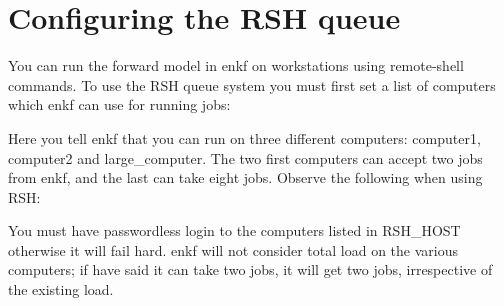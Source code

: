 \documentclass[a4paper,10pt,english]{sphinxmanual}
\begin{document}
\section{Configuring the RSH queue}
\label{\detokenize{keywords/index:configuring-the-rsh-queue}}\label{\detokenize{keywords/index:id15}}\label{\detokenize{keywords/index:rsh-host}}
\begin{sphinxShadowBox}

You can run the forward model in enkf on workstations using remote-shell
commands. To use the RSH queue system you must first set a list of computers
which enkf can use for running jobs:

%
\begin{sphinxVerbatim}[commandchars=\\\{\}]
        
\end{sphinxVerbatim}

Here you tell enkf that you can run on three different computers: computer1,
computer2 and large\_computer. The two first computers can accept two jobs from
enkf, and the last can take eight jobs. Observe the following when using RSH:

You must have passwordless login to the computers listed in RSH\_HOST otherwise
it will fail hard. enkf will not consider total load on the various computers;
if have said it can take two jobs, it will get two jobs, irrespective of the
existing load.
\end{sphinxShadowBox}
\label{\detokenize{keywords/index:rsh-command}}
\end{document}
